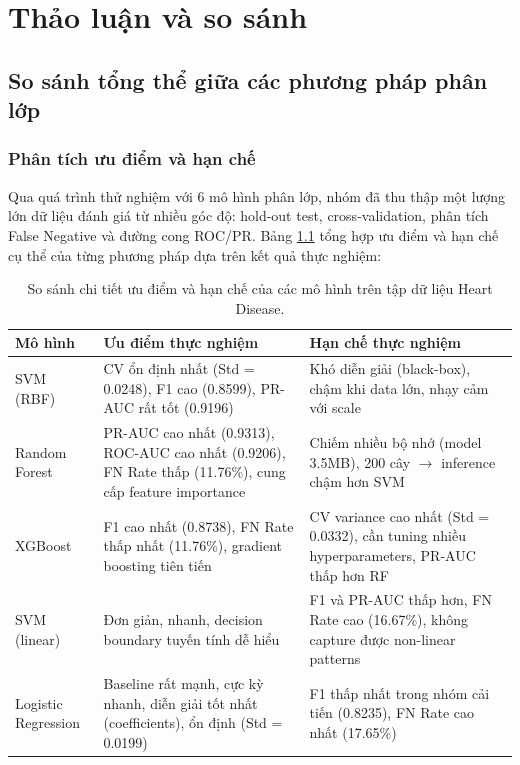 \chapter{Thảo luận và so sánh}\label{chapter_discussion}

\section{So sánh tổng thể giữa các phương pháp phân lớp}

\subsection{Phân tích ưu điểm và hạn chế}

Qua quá trình thử nghiệm với 6 mô hình phân lớp, nhóm đã thu thập một lượng lớn dữ liệu đánh giá từ nhiều góc độ: hold-out test, cross-validation, phân tích False Negative và đường cong ROC/PR. Bảng \ref{tab:pros_cons} tổng hợp ưu điểm và hạn chế cụ thể của từng phương pháp dựa trên kết quả thực nghiệm:

\begin{table}[H]
\centering
\caption{So sánh chi tiết ưu điểm và hạn chế của các mô hình trên tập dữ liệu Heart Disease.}
\label{tab:pros_cons}
\small
\begin{tabular}{|l|p{5cm}|p{5cm}|}
\hline
\textbf{Mô hình} & \textbf{Ưu điểm thực nghiệm} & \textbf{Hạn chế thực nghiệm} \\ \hline
SVM (RBF) & CV ổn định nhất (Std = 0.0248), F1 cao (0.8599), PR-AUC rất tốt (0.9196) & Khó diễn giải (black-box), chậm khi data lớn, nhạy cảm với scale \\ \hline
Random Forest & PR-AUC cao nhất (0.9313), ROC-AUC cao nhất (0.9206), FN Rate thấp (11.76\%), cung cấp feature importance & Chiếm nhiều bộ nhớ (model 3.5MB), 200 cây $\rightarrow$ inference chậm hơn SVM \\ \hline
XGBoost & F1 cao nhất (0.8738), FN Rate thấp nhất (11.76\%), gradient boosting tiên tiến & CV variance cao nhất (Std = 0.0332), cần tuning nhiều hyperparameters, PR-AUC thấp hơn RF \\ \hline
SVM (linear) & Đơn giản, nhanh, decision boundary tuyến tính dễ hiểu & F1 và PR-AUC thấp hơn, FN Rate cao (16.67\%), không capture được non-linear patterns \\ \hline
Logistic Regression & Baseline rất mạnh, cực kỳ nhanh, diễn giải tốt nhất (coefficients), ổn định (Std = 0.0199) & F1 thấp nhất trong nhóm cải tiến (0.8235), FN Rate cao nhất (17.65\%) \\ \hline
\end{tabular}
\end{table}

